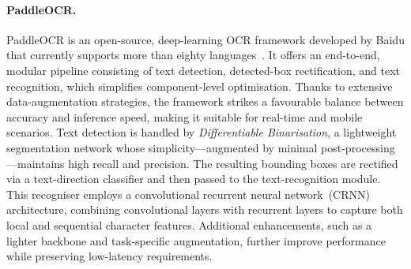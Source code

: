 \documentclass{SGGW-thesis-EN}
\begin{document}
\paragraph{PaddleOCR.}
PaddleOCR is an open-source, deep-learning OCR framework developed by Baidu that currently
supports more than eighty languages~\cite{du2020ppocr}.
It offers an end-to-end, modular pipeline consisting of text detection, detected-box
rectification, and text recognition, which simplifies component-level optimisation.
Thanks to extensive data-augmentation strategies, the framework strikes a favourable
balance between accuracy and inference speed, making it suitable for real-time and
mobile scenarios.
Text detection is handled by \textit{Differentiable Binarisation}, a lightweight
segmentation network whose simplicity—augmented by minimal post-processing—maintains
high recall and precision.
The resulting bounding boxes are rectified via a text-direction classifier and then
passed to the text-recognition module.
This recogniser employs a convolutional recurrent neural network~(CRNN) architecture,
combining convolutional layers with recurrent layers to capture both local and
sequential character features.
Additional enhancements, such as a lighter backbone and task-specific augmentation,
further improve performance while preserving low-latency requirements.
\end{document}
